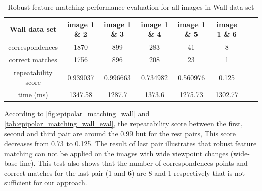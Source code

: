 \begin{table}[H]
  \begin{tabular}{| c || c | c | c | c | c | c | c |}
      \hline
      Wall data set & image 1 \& 2 & image 1 \& 3 & image 1 \& 4 & image 1 \& 5 & image 1 \& 6 \\ \hline \hline
      correspondences & 1870 & 899 & 283 & 41 & 8 \\ \hline
      correct matches & 1756 & 896 & 208 & 23 & 1 \\ \hline
      repeatability score & 0.939037 & 0.996663 & 0.734982 & 0.560976 & 0.125 \\ \hline
      time (ms) & 1347.58 & 1287.7 & 1373.6 & 1275.73 & 1302.77 \\ \hline
  \end{tabular}
  \caption{Robust feature matching performance evaluation for all images in Wall data set} \label{tab:epipolar_matching_wall_eval}
\end{table}

According to \autoref{fig:epipolar_matching_wall} and \autoref{tab:epipolar_matching_wall_eval}, the repeatability score between the first, second and third pair are around the 0.99 but for the rest pairs, This score decreases from 0.73 to 0.125. The result of last pair illustrates that robust feature matching can not be applied on the images with wide viewpoint changes (wide-base-line). This test also shows that the number of correspondences points and correct matches for the last pair (1 and 6) are 8 and 1 respectively that is not sufficient for our approach.

